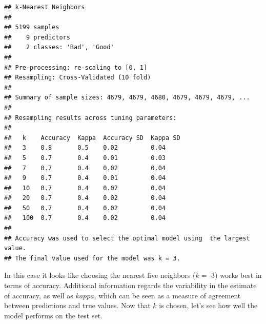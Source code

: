 \documentclass[english,nohyper,titlepage]{tufte-handout}\usepackage{knitr}
\begin{document}
\begin{knitrout}\footnotesize
{}\color{fgcolor}\begin{kframe}
\begin{alltt}
\hlstd{(}\hlstd{)}
 \hlkwb{=} \hlstd{(}\hlstd{=}\hlstd{,} \hlstd{=}\hlstd{)}
 \hlkwb{=} \hlstd{(}\hlstd{=}\hlstd{(}\hlstd{(}\hlstd{,} \hlstd{,} \hlstd{),} \hlstd{,} \hlstd{,} \hlstd{))} 
 \hlkwb{=} \hlopt{~}  \hlstd{=}\hlstd{,}
                    \hlstd{=}\hlstd{,} 
                     

\end{alltt}
\begin{verbatim}
## k-Nearest Neighbors 
## 
## 5199 samples
##    9 predictors
##    2 classes: 'Bad', 'Good' 
## 
## Pre-processing: re-scaling to [0, 1] 
## Resampling: Cross-Validated (10 fold) 
## 
## Summary of sample sizes: 4679, 4679, 4680, 4679, 4679, 4679, ... 
## 
## Resampling results across tuning parameters:
## 
##   k    Accuracy  Kappa  Accuracy SD  Kappa SD
##   3    0.8       0.5    0.02         0.04    
##   5    0.7       0.4    0.01         0.03    
##   7    0.7       0.4    0.02         0.04    
##   9    0.7       0.4    0.01         0.04    
##   10   0.7       0.4    0.02         0.04    
##   20   0.7       0.4    0.02         0.04    
##   50   0.7       0.4    0.02         0.04    
##   100  0.7       0.4    0.02         0.04    
## 
## Accuracy was used to select the optimal model using  the largest value.
## The final value used for the model was k = 3.
\end{verbatim}
\end{kframe}
\end{knitrout}


In this case it looks like choosing the nearest five neighbors ($k=$ 3) works best in terms of accuracy.  Additional information regards the variability in the estimate of accuracy, as well as $kappa$, which can be seen as a measure of agreement between predictions and true values. Now that $k$ is chosen, let's see how well the model performs on the test set.
\end{document}

